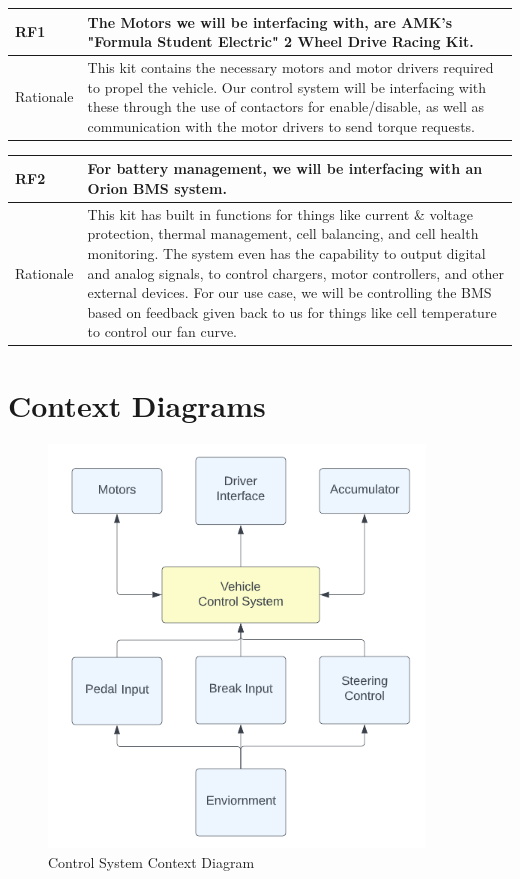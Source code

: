 \documentclass[12pt]{article}
\newcommand{\tableVspace}{5mm}
\newcommand{\ReqColA}{0.13\textwidth}
\newcommand{\ReqColB}{0.82\textwidth}
\begin{document}
\vspace{4mm}

\noindent
\begin{tabular}{| p{\ReqColA} | p{\ReqColB}|}
\hline
\rowcolor[gray]{0.9}
RF1 & The Motors we will be interfacing with, are AMK's "Formula Student Electric" 2 Wheel Drive Racing Kit.\\
\hline
Rationale & This kit contains the necessary motors and motor drivers required to propel the vehicle. Our control system will be interfacing with these through the use of contactors for enable/disable, as well as communication with the motor drivers to send torque requests. \\
\hline
\end{tabular}

\vspace{\tableVspace}

\noindent
\begin{tabular}{| p{\ReqColA} | p{\ReqColB}|}
\hline
\rowcolor[gray]{0.9}
RF2 & For battery management, we will be interfacing with an Orion BMS system. \\
\hline
Rationale & This kit has built in functions for things like current \& voltage protection, thermal management, cell balancing, and cell health monitoring. The system even has the capability to output digital and analog signals, to control chargers, motor controllers, and other external devices. 
For our use case, we will be controlling the BMS based on feedback given back to us for things like cell temperature to control our fan curve. \\
\hline
\end{tabular}

\newpage
\section{Context Diagrams}

\begin{figure}[htp]
    \centering
    \includegraphics[width=10cm]{context_diagram.png}
    \caption{Control System Context Diagram}
    \label{fig:context_diagram}
\end{figure}
\end{document}
